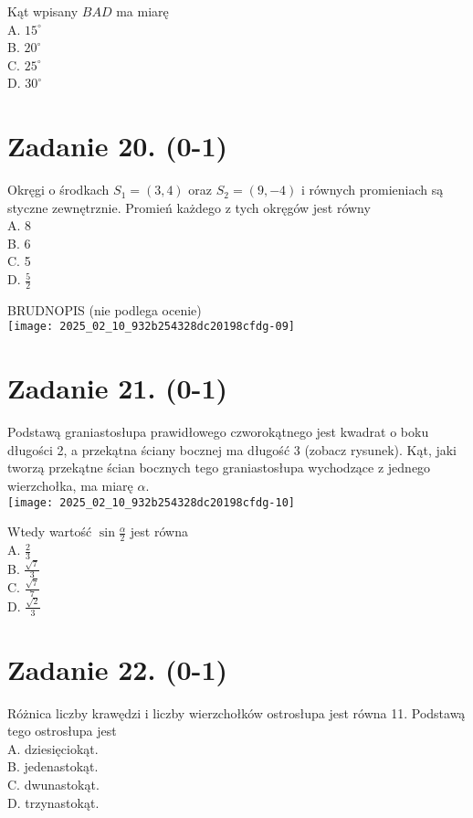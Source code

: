 \documentclass[10pt]{article}
\begin{document}
Kąt wpisany \(B A D\) ma miarę\\
A. \(15^{\circ}\)\\
B. \(20^{\circ}\)\\
C. \(25^{\circ}\)\\
D. \(30^{\circ}\)

\section*{Zadanie 20. (0-1)}
Okręgi o środkach \(S_{1}=(3,4)\) oraz \(S_{2}=(9,-4)\) i równych promieniach są styczne zewnętrznie. Promień każdego z tych okręgów jest równy\\
A. 8\\
B. 6\\
C. 5\\
D. \(\frac{5}{2}\)

BRUDNOPIS (nie podlega ocenie)\\
\texttt{[image: 2025\_02\_10\_932b254328dc20198cfdg-09]}

\section*{Zadanie 21. (0-1)}
Podstawą graniastosłupa prawidłowego czworokątnego jest kwadrat o boku długości 2, a przekątna ściany bocznej ma długość 3 (zobacz rysunek). Kąt, jaki tworzą przekątne ścian bocznych tego graniastosłupa wychodzące z jednego wierzchołka, ma miarę \(\alpha\).\\
\texttt{[image: 2025\_02\_10\_932b254328dc20198cfdg-10]}

Wtedy wartość \(\sin \frac{\alpha}{2}\) jest równa\\
A. \(\frac{2}{3}\)\\
B. \(\frac{\sqrt{7}}{3}\)\\
C. \(\frac{\sqrt{7}}{7}\)\\
D. \(\frac{\sqrt{2}}{3}\)

\section*{Zadanie 22. (0-1)}
Różnica liczby krawędzi i liczby wierzchołków ostrosłupa jest równa 11. Podstawą tego ostrosłupa jest\\
A. dziesięciokąt.\\
B. jedenastokąt.\\
C. dwunastokąt.\\
D. trzynastokąt.
\end{document}
